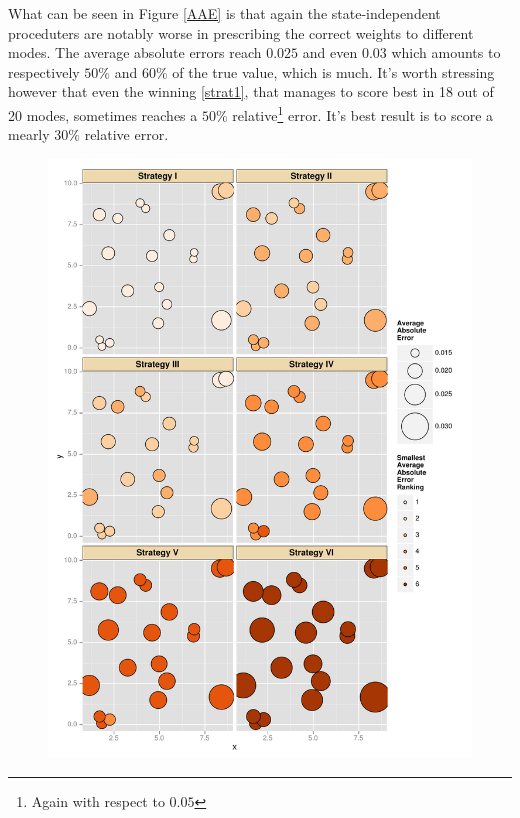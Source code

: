 What can be seen in Figure \ref{AAE} is that again the state-independent proceduters are notably worse in prescribing the correct weights to different modes. The average absolute errors reach $0.025$ and even $0.03$ which amounts to respectively $50\%$ and $60\%$ of the true value, which is much. It's worth stressing however that even the winning \ref{strat1}, that manages to score best in 18 out of 20 modes, sometimes reaches a $50\%$ relative\footnote{Again with respect to $0.05$} error. It's best result is to score a mearly $30\%$ relative error.         

\begin{figure}[ht]
	\centering \includegraphics[height=.7\textheight,keepaspectratio=TRUE]{./img/ggplotAverageAbsoluteError.pdf}
	\caption[Average Absolute Errors in simulations consisting of 2500 iterations of the \PT.]{
}
\end{figure}

